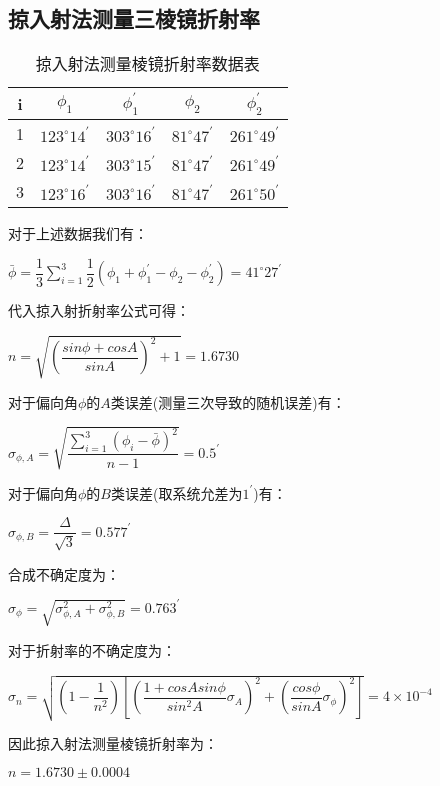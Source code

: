 \documentclass[a4 paper,12pt]{article}
\begin{document}
\subsection{掠入射法测量三棱镜折射率}
\begin{table}[H]
	\centering
	\caption{掠入射法测量棱镜折射率数据表}
	\label{掠入射法测量棱镜折射率数据表}
	\begin{tabular}{c|*{4}{c}}
	\toprule[0.5mm]
	i&$\phi_{1}$&$\phi_{1}^{\prime}$&$\phi_{2}$&$\phi_{2}^{\prime}$\\
	\midrule
	1&$123^{\circ}14^{\prime}$&$303^{\circ}16^{\prime}$&$81^{\circ}47^{\prime}$&$261^{\circ}49^{\prime}$\\
	2&$123^{\circ}14^{\prime}$&$303^{\circ}15^{\prime}$&$81^{\circ}47^{\prime}$&$261^{\circ}49^{\prime}$\\
	3&$123^{\circ}16^{\prime}$&$303^{\circ}16^{\prime}$&$81^{\circ}47^{\prime}$&$261^{\circ}50^{\prime}$\\
	\bottomrule[0.5mm]
    \end{tabular}
\end{table}
对于上述数据我们有：
\begin{center}
	$\bar{\phi}=\dfrac{1}{3}\sum\limits_{i=1}^{3}\dfrac{1}{2}(\phi_{1}+\phi_{1}^{\prime}-\phi_{2}-\phi_{2}^{\prime})=41^{\circ}27^{\prime}$
\end{center}
\par 代入掠入射折射率公式可得：
\begin{center}
	$n=\sqrt{(\dfrac{sin\phi+cosA}{sinA})^{2}+1}=1.6730$
\end{center}
\par 对于偏向角$\phi$的$A$类误差(测量三次导致的随机误差)有：
\begin{center}
	$\sigma_{\phi,A}=\sqrt{\dfrac{\sum\limits_{i=1}^{3}(\phi_{i}-\bar{\phi})^{2}}{n-1}}=0.5^{\prime}$
\end{center}
\par 对于偏向角$\phi$的$B$类误差(取系统允差为$1^{\prime}$)有：
\begin{center}
	$\sigma_{\phi,B}=\dfrac{\Delta}{\sqrt{3}}=0.577^{\prime}$
\end{center}
\par 合成不确定度为：
\begin{center}
	$\sigma_{\phi}=\sqrt{\sigma_{\phi,A}^{2}+\sigma_{\phi,B}^{2}}=0.763^{\prime}$
\end{center}
\par 对于折射率的不确定度为：
\begin{center}
	$\sigma_{n}=\sqrt{(1-\dfrac{1}{n^{2}})[(\dfrac{1+cosAsin\phi}{sin^{2}A}\sigma_{A})^{2}+(\dfrac{cos\phi}{sinA}\sigma_{\phi})^{2}]}=4\times10^{-4}$
\end{center}
\par 因此掠入射法测量棱镜折射率为：
\begin{center}
	$n=1.6730\pm 0.0004$
\end{center}
\end{document}
